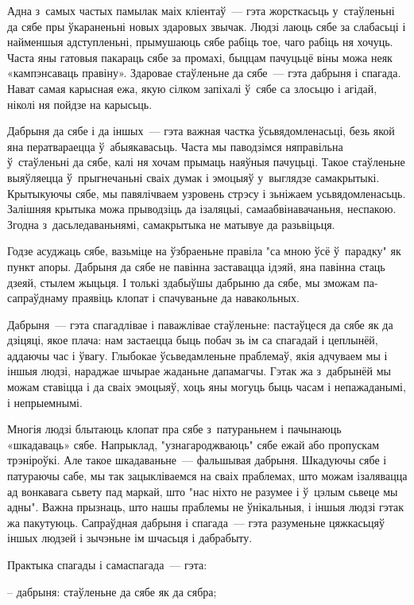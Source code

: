 Адна з~самых частых памылак маіх кліентаў~--- гэта жорсткасьць у~стаўленьні да сябе пры ўкараненьні новых здаровых звычак. Людзі лаюць сябе за слабасьці і найменшыя адступленьні, прымушаюць сябе рабіць тое, чаго рабіць ня хочуць. Часта яны гатовыя пакараць сябе за промахі, быццам пачуцьцё віны можа неяк «кампэнсаваць правіну». Здаровае стаўленьне да сябе~--- гэта дабрыня і спагада. Нават самая карысная ежа, якую сілком запіхалі ў~сябе са злосьцю і агідай, ніколі ня пойдзе на карысьць. 

Дабрыня да сябе і да іншых~--- гэта важная частка ўсьвядомленасьці, безь якой яна ператвараецца ў~абыякавасьць. Часта мы паводзімся няправільна ў~стаўленьні да сябе, калі ня хочам прымаць наяўныя пачуцьці. Такое стаўленьне выяўляецца ў~прыгнечаньні сваіх думак і эмоцыяў у~выглядзе самакрытыкі. Крытыкуючы сябе, мы павялічваем узровень стрэсу і зьніжаем усьвядомленасьць. Залішняя крытыка можа прыводзіць да ізаляцыі, самаабвінавачаньня, неспакою. Згодна з~дасьледаваньнямі, самакрытыка не матывуе да разьвіцьця.

Годзе асуджаць сябе, вазьміце на ўзбраеньне правіла "са мною ўсё ў~парадку" як пункт апоры. Дабрыня да сябе не павінна заставацца ідэяй, яна павінна стаць дзеяй, стылем жыцьця. І толькі здабыўшы дабрыню да сябе, мы зможам па-сапраўднаму праявіць клопат і спачуваньне да навакольных.

Дабрыня~--- гэта спагадлівае і паважлівае стаўленьне: пастаўцеся да сябе як да дзіцяці, якое плача: нам застаецца быць побач зь ім са спагадай і цеплынёй, аддаючы час і ўвагу. Глыбокае ўсьведамленьне праблемаў, якія адчуваем мы і іншыя людзі, нараджае шчырае жаданьне дапамагчы. Гэтак жа з~дабрынёй мы можам ставіцца і да сваіх эмоцыяў, хоць яны могуць быць часам і непажаданымі, і непрыемнымі.

Многія людзі блытаюць клопат пра сябе з~патураньнем і пачынаюць «шкадаваць» сябе. Напрыклад, "узнагароджваюць" сябе ежай або пропускам трэніроўкі. Але такое шкадаваньне~--- фальшывая дабрыня. Шкадуючы сябе і патураючы сабе, мы так зацыкліваемся на сваіх праблемах, што можам ізалявацца ад вонкавага сьвету пад маркай, што "нас ніхто не разумее і ў~цэлым сьвеце мы адны". Важна прызнаць, што нашы праблемы не ўнікальныя, і іншыя людзі гэтак жа пакутуюць. Сапраўдная дабрыня і спагада~--- гэта разуменьне цяжкасьцяў іншых людзей і зычэньне ім шчасьця і дабрабыту.

Практыка спагады і самаспагада~--- гэта: 

– дабрыня: стаўленьне да сябе як да сябра;

